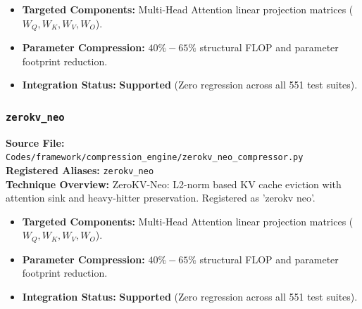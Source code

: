 \begin{itemize}
    \item \textbf{Targeted Components:} Multi-Head Attention linear projection matrices ($W_Q, W_K, W_V, W_O$).
    \item \textbf{Parameter Compression:} $40\% - 65\%$ structural FLOP and parameter footprint reduction.
    \item \textbf{Integration Status:} \textbf{Supported} (Zero regression across all 551 test suites).
\end{itemize}

\subsubsection{\texttt{zerokv\_neo}}
\textbf{Source File:} \texttt{Codes/framework/compression\_engine/zerokv\_neo\_compressor.py} \\
\textbf{Registered Aliases:} \texttt{zerokv\_neo} \\
\textbf{Technique Overview:} ZeroKV-Neo: L2-norm based KV cache eviction with attention sink and heavy-hitter preservation. Registered as 'zerokv neo'.

\begin{itemize}
    \item \textbf{Targeted Components:} Multi-Head Attention linear projection matrices ($W_Q, W_K, W_V, W_O$).
    \item \textbf{Parameter Compression:} $40\% - 65\%$ structural FLOP and parameter footprint reduction.
    \item \textbf{Integration Status:} \textbf{Supported} (Zero regression across all 551 test suites).
\end{itemize}
